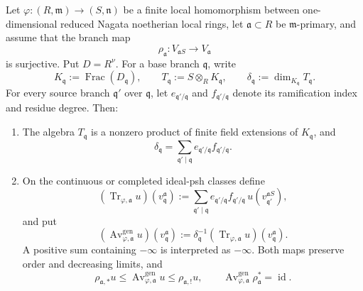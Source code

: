 \begin{theorem}
\label{thm:p126-curve-generic-norm-trace-descent}
Let
\(\varphi:(R,\mathfrak m)\to(S,\mathfrak n)\) be a finite local
homomorphism between one-dimensional reduced Nagata noetherian local rings,
let \(\mathfrak a\subset R\) be \(\mathfrak m\)-primary, and assume that the
branch map
\[
 \rho_{\mathfrak a}:V_{\mathfrak aS}\longrightarrow V_{\mathfrak a}
\]
is surjective.  Put \(D=R^\nu\).  For a base branch \(\mathfrak q\), write
\[
 K_{\mathfrak q}:=\operatorname{Frac}(D_{\mathfrak q}),\qquad
 T_{\mathfrak q}:=S\otimes_RK_{\mathfrak q},\qquad
 \delta_{\mathfrak q}:=\dim_{K_{\mathfrak q}}T_{\mathfrak q}.
\]
For every source branch \(\mathfrak q'\) over \(\mathfrak q\), let
\(e_{\mathfrak q'/\mathfrak q}\) and
\(f_{\mathfrak q'/\mathfrak q}\) denote its ramification index and residue
degree.  Then:
\begin{enumerate}
\item The algebra \(T_{\mathfrak q}\) is a nonzero product of finite field
      extensions of \(K_{\mathfrak q}\), and
      \[
       \delta_{\mathfrak q}
          =\sum_{\mathfrak q'\mid\mathfrak q}
             e_{\mathfrak q'/\mathfrak q}
             f_{\mathfrak q'/\mathfrak q}.
       \tag{\(\triangleleft\triangleleft\)}
       \label{eq:p126-curve-generic-degree}
      \]
\item On the continuous or completed ideal-psh classes define
      \[
       (\operatorname{Tr}_{\varphi,\mathfrak a}u)
          (v_{\mathfrak q}^{\mathfrak a})
       :=\sum_{\mathfrak q'\mid\mathfrak q}
          e_{\mathfrak q'/\mathfrak q}
          f_{\mathfrak q'/\mathfrak q}\,
          u(v_{\mathfrak q'}^{\mathfrak aS}),
      \]
      and put
      \[
       (\operatorname{Av}_{\varphi,\mathfrak a}^{\mathrm{gen}}u)
          (v_{\mathfrak q}^{\mathfrak a})
       :=\delta_{\mathfrak q}^{-1}
          (\operatorname{Tr}_{\varphi,\mathfrak a}u)
          (v_{\mathfrak q}^{\mathfrak a}).
       \tag{\(\triangleright\triangleright\)}
       \label{eq:p126-curve-generic-average}
      \]
      A positive sum containing \(-\infty\) is interpreted as
      \(-\infty\).  Both maps preserve order and decreasing limits, and
      \[
       \rho_{\mathfrak a,*}u
          \leq\operatorname{Av}_{\varphi,\mathfrak a}^{\mathrm{gen}}u
          \leq\rho_{\mathfrak a,!}u,
       \qquad
       \operatorname{Av}_{\varphi,\mathfrak a}^{\mathrm{gen}}
          \rho_{\mathfrak a}^*=\operatorname{id}.
       \tag{\(\blacktriangleright\blacktriangleright\)}
       \label{eq:p126-curve-generic-average-retraction}
\]
\end{enumerate}
\end{theorem}
